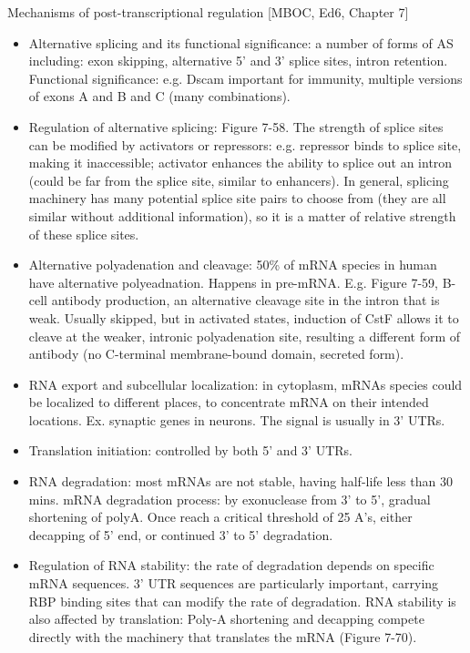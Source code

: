 \documentclass{report}
\begin{document}
Mechanisms of post-transcriptional regulation [MBOC, Ed6, Chapter 7]
\begin{itemize}
	\item Alternative splicing and its functional significance: a number of forms of AS including: exon skipping, alternative 5' and 3' splice sites, intron retention. Functional significance: e.g. Dscam important for immunity, multiple versions of exons A and B and C (many combinations). 
	
	\item Regulation of alternative splicing: Figure 7-58. The strength of splice sites can be modified by activators or repressors: e.g. repressor binds to splice site, making it inaccessible; activator enhances the ability to splice out an intron (could be far from the splice site, similar to enhancers). In general, splicing machinery has many potential splice site pairs to choose from (they are all similar without additional information), so it is a matter of relative strength of these splice sites. 
	
	\item Alternative polyadenation and cleavage: 50\% of mRNA species in human have alternative polyeadnation. Happens in pre-mRNA. E.g. Figure 7-59, B-cell antibody production, an alternative cleavage site in the intron that is weak. Usually skipped, but in activated states, induction of CstF allows it to cleave at the weaker, intronic polyadenation site, resulting a different form of antibody (no C-terminal membrane-bound domain, secreted form). 
	
	\item RNA export and subcellular localization: in cytoplasm, mRNAs species could be localized to different places, to concentrate mRNA on their intended locations. Ex. synaptic genes in neurons. The signal is usually in 3' UTRs. 
	
	\item Translation initiation: controlled by both 5' and 3' UTRs. 
	
	\item RNA degradation: most mRNAs are not stable, having half-life less than 30 mins. mRNA degradation process: by exonuclease from 3' to 5', gradual shortening of polyA. Once reach a critical threshold of 25 A's, either decapping of 5' end, or continued 3' to 5' degradation. 
	
	\item Regulation of RNA stability: the rate of degradation depends on specific mRNA sequences. 3' UTR sequences are particularly important, carrying RBP binding sites that can modify the rate of degradation. RNA stability is also affected by translation: Poly-A shortening and decapping compete directly with the machinery that translates the mRNA (Figure 7-70).  
	

\end{itemize}
\end{document}

